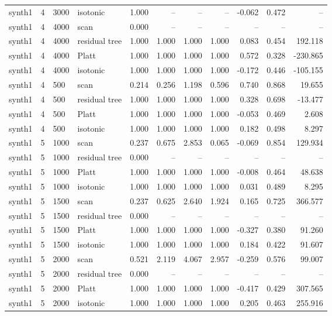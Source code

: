 \begin{tabular}{lrllrrrrrrr}
synth1 & 4 & 3000 & isotonic & 1.000 & -- & -- & -- & -0.062 & 0.472 & -- \\
synth1 & 4 & 4000 & scan & 0.000 & -- & -- & -- & -- & -- & -- \\
synth1 & 4 & 4000 & residual tree & 1.000 & 1.000 & 1.000 & 1.000 & 0.083 & 0.454 & 192.118 \\
synth1 & 4 & 4000 & Platt & 1.000 & 1.000 & 1.000 & 1.000 & 0.572 & 0.328 & -230.865 \\
synth1 & 4 & 4000 & isotonic & 1.000 & 1.000 & 1.000 & 1.000 & -0.172 & 0.446 & -105.155 \\
synth1 & 4 & 500 & scan & 0.214 & 0.256 & 1.198 & 0.596 & 0.740 & 0.868 & 19.655 \\
synth1 & 4 & 500 & residual tree & 1.000 & 1.000 & 1.000 & 1.000 & 0.328 & 0.698 & -13.477 \\
synth1 & 4 & 500 & Platt & 1.000 & 1.000 & 1.000 & 1.000 & -0.053 & 0.469 & 2.608 \\
synth1 & 4 & 500 & isotonic & 1.000 & 1.000 & 1.000 & 1.000 & 0.182 & 0.498 & 8.297 \\
synth1 & 5 & 1000 & scan & 0.237 & 0.675 & 2.853 & 0.065 & -0.069 & 0.854 & 129.934 \\
synth1 & 5 & 1000 & residual tree & 0.000 & -- & -- & -- & -- & -- & -- \\
synth1 & 5 & 1000 & Platt & 1.000 & 1.000 & 1.000 & 1.000 & -0.008 & 0.464 & 48.638 \\
synth1 & 5 & 1000 & isotonic & 1.000 & 1.000 & 1.000 & 1.000 & 0.031 & 0.489 & 8.295 \\
synth1 & 5 & 1500 & scan & 0.237 & 0.625 & 2.640 & 1.924 & 0.165 & 0.725 & 366.577 \\
synth1 & 5 & 1500 & residual tree & 0.000 & -- & -- & -- & -- & -- & -- \\
synth1 & 5 & 1500 & Platt & 1.000 & 1.000 & 1.000 & 1.000 & -0.327 & 0.380 & 91.260 \\
synth1 & 5 & 1500 & isotonic & 1.000 & 1.000 & 1.000 & 1.000 & 0.184 & 0.422 & 91.607 \\
synth1 & 5 & 2000 & scan & 0.521 & 2.119 & 4.067 & 2.957 & -0.259 & 0.576 & 99.007 \\
synth1 & 5 & 2000 & residual tree & 0.000 & -- & -- & -- & -- & -- & -- \\
synth1 & 5 & 2000 & Platt & 1.000 & 1.000 & 1.000 & 1.000 & -0.417 & 0.429 & 307.565 \\
synth1 & 5 & 2000 & isotonic & 1.000 & 1.000 & 1.000 & 1.000 & 0.205 & 0.463 & 255.916 \\

\end{tabular}
